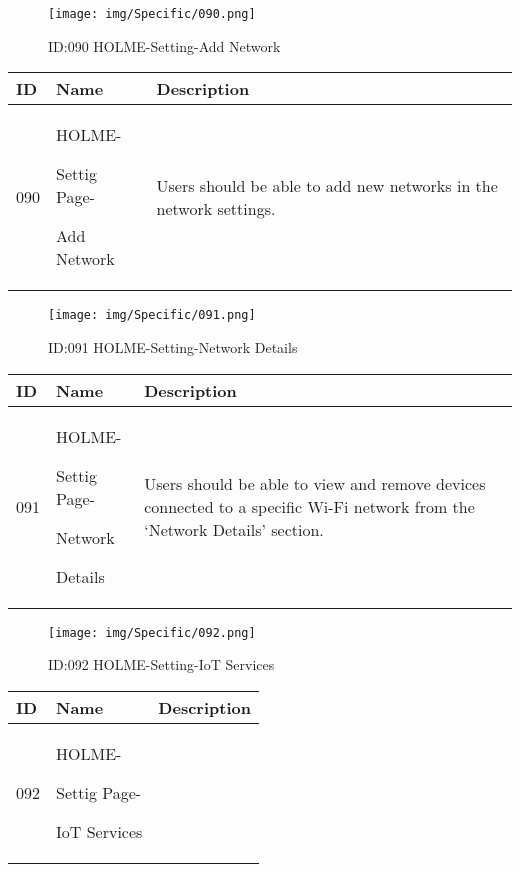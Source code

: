 \documentclass[conference]{IEEEtran}
\begin{document}
\begin{enumerate}
\begin{figure}[h]
\centering                                         
\texttt{[image: img/Specific/090.png]}
\caption{ID:090 HOLME-Setting-Add Network}
\end{figure}
\begin{table}[h]
\def\arraystretch{1.2} \small
    \begin{tabular}{|p{1cm}|p{1.8cm}|p{5.0cm}|}
        \hline
        ID & Name & Description\\ \hline
         090 \par  & HOLME-\par Settig Page- \par Add Network & 
       Users should be able to add new networks in the network settings.
         \\ \hline
    \end{tabular}
\end{table}
\begin{figure}[h]
\centering                                         
\texttt{[image: img/Specific/091.png]}
\caption{ID:091 HOLME-Setting-Network Details}
\end{figure}
\begin{table}[h]
\def\arraystretch{1.2} \small
    \begin{tabular}{|p{1cm}|p{1.8cm}|p{5.0cm}|}
        \hline
        ID & Name & Description\\ \hline
         091 \par  & HOLME-\par Settig Page- \par Network \par  Details & 
       Users should be able to view and remove devices connected to a specific Wi-Fi network from the `Network Details' section.
         \\ \hline
    \end{tabular}
\end{table}
\begin{figure}[h]
\centering                                         
\texttt{[image: img/Specific/092.png]}
\caption{ID:092 HOLME-Setting-IoT Services}
\end{figure}
\begin{table}[h]
\def\arraystretch{1.2} \small
    \begin{tabular}{|p{1cm}|p{1.8cm}|p{5.0cm}|}
        \hline
        ID & Name & Description\\ \hline
         092 \par  & HOLME-\par Settig Page- \par IoT Services& 

\end{tabular}
\end{table}
\end{enumerate}
\end{document}
